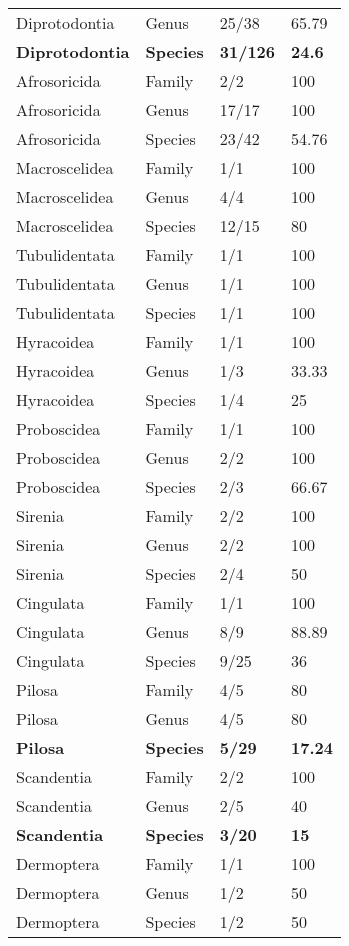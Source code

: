 \begin{longtable}{llll}
  Diprotodontia & Genus & 25/38 & 65.79 \\ 
  \textbf{Diprotodontia} & \textbf{Species} & \textbf{31/126} & \textbf{24.6} \\ 
  Afrosoricida & Family & 2/2 & 100 \\ 
  Afrosoricida & Genus & 17/17 & 100 \\ 
  Afrosoricida & Species & 23/42 & 54.76 \\ 
  Macroscelidea & Family & 1/1 & 100 \\ 
  Macroscelidea & Genus & 4/4 & 100 \\ 
  Macroscelidea & Species & 12/15 & 80 \\ 
  Tubulidentata & Family & 1/1 & 100 \\ 
  Tubulidentata & Genus & 1/1 & 100 \\ 
  Tubulidentata & Species & 1/1 & 100 \\ 
  Hyracoidea & Family & 1/1 & 100 \\ 
  Hyracoidea & Genus & 1/3 & 33.33 \\ 
  Hyracoidea & Species & 1/4 & 25 \\ 
  Proboscidea & Family & 1/1 & 100 \\ 
  Proboscidea & Genus & 2/2 & 100 \\ 
  Proboscidea & Species & 2/3 & 66.67 \\ 
  Sirenia & Family & 2/2 & 100 \\ 
  Sirenia & Genus & 2/2 & 100 \\ 
  Sirenia & Species & 2/4 & 50 \\ 
  Cingulata & Family & 1/1 & 100 \\ 
  Cingulata & Genus & 8/9 & 88.89 \\ 
  Cingulata & Species & 9/25 & 36 \\ 
  Pilosa & Family & 4/5 & 80 \\ 
  Pilosa & Genus & 4/5 & 80 \\ 
  \textbf{Pilosa} & \textbf{Species} & \textbf{5/29} & \textbf{17.24} \\ 
  Scandentia & Family & 2/2 & 100 \\ 
  Scandentia & Genus & 2/5 & 40 \\ 
  \textbf{Scandentia} & \textbf{Species} & \textbf{3/20} & \textbf{15} \\ 
  Dermoptera & Family & 1/1 & 100 \\ 
  Dermoptera & Genus & 1/2 & 50 \\ 
  Dermoptera & Species & 1/2 & 50 \\ 

\end{longtable}

